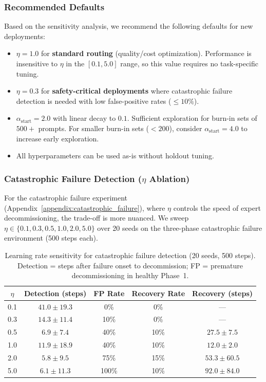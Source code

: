 \subsubsection{Recommended Defaults}

Based on the sensitivity analysis, we recommend the following defaults for
new deployments:

\begin{itemize}[leftmargin=*,noitemsep]
    \item $\eta{=}1.0$ for \textbf{standard routing} (quality/cost optimization).
          Performance is insensitive to $\eta$ in the $[0.1, 5.0]$ range,
          so this value requires no task-specific tuning.
    \item $\eta{=}0.3$ for \textbf{safety-critical deployments} where
          catastrophic failure detection is needed with low false-positive
          rates (${\leq}10\%$).
    \item $\alpha_{\text{start}}{=}2.0$ with linear decay to $0.1$.
          Sufficient exploration for burn-in sets of $500{+}$ prompts.
          For smaller burn-in sets ($< 200$), consider $\alpha_{\text{start}}
          {=}4.0$ to increase early exploration.
    \item All hyperparameters can be used as-is without holdout tuning.
\end{itemize}

\subsubsection{Catastrophic Failure Detection ($\eta$ Ablation)}
\label{appendix:hp_catastrophic_eta}

For the catastrophic failure experiment (Appendix~\ref{appendix:catastrophic_failure}),
where $\eta$ controls the speed of expert decommissioning, the trade-off is
more nuanced.  We sweep $\eta \in \{0.1, 0.3, 0.5, 1.0, 2.0, 5.0\}$ over
20 seeds on the three-phase catastrophic failure environment (500 steps each).

\begin{table}[h]
\centering
\caption{Learning rate sensitivity for catastrophic failure detection (20
seeds, 500 steps).  Detection = steps after failure onset to decommission;
FP = premature decommissioning in healthy Phase~1.}
\label{tab:eta_catastrophic}
\small
\begin{tabular}{@{}ccccc@{}}
\toprule
$\eta$ & \textbf{Detection (steps)} & \textbf{FP Rate} & \textbf{Recovery Rate} & \textbf{Recovery (steps)} \\
\midrule
0.1  & $41.0 \pm 19.3$ & 0\%   & 0\%  & --- \\
0.3  & $14.3 \pm 11.4$ & 10\%  & 0\%  & --- \\
0.5  & $6.9 \pm 7.4$   & 40\%  & 10\% & $27.5 \pm 7.5$ \\
1.0  & $11.9 \pm 18.9$ & 40\%  & 10\% & $12.0 \pm 2.0$ \\
2.0  & $5.8 \pm 9.5$   & 75\%  & 15\% & $53.3 \pm 60.5$ \\
5.0  & $6.1 \pm 11.3$  & 100\% & 10\% & $92.0 \pm 84.0$ \\
\bottomrule
\end{tabular}
\end{table}

